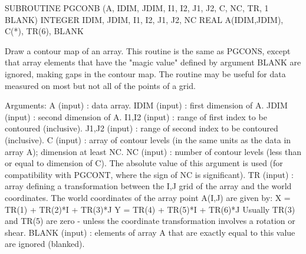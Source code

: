 {\eightpoint\begintt
      SUBROUTINE PGCONB (A, IDIM, JDIM, I1, I2, J1, J2, C, NC, TR, 
     1                   BLANK)
      INTEGER IDIM, JDIM, I1, I2, J1, J2, NC
      REAL    A(IDIM,JDIM), C(*), TR(6), BLANK
 
Draw a contour map of an array. This routine is the same as PGCONS,
except that array elements that have the "magic value" defined by
argument BLANK are ignored, making gaps in the contour map. The
routine may be useful for data measured on most but not all of the
points of a grid.
 
Arguments:
 A      (input)  : data array.
 IDIM   (input)  : first dimension of A.
 JDIM   (input)  : second dimension of A.
 I1,I2  (input)  : range of first index to be contoured (inclusive).
 J1,J2  (input)  : range of second index to be contoured (inclusive).
 C      (input)  : array of contour levels (in the same units as the
                   data in array A); dimension at least NC.
 NC     (input)  : number of contour levels (less than or equal to
                   dimension of C). The absolute value of this
                   argument is used (for compatibility with PGCONT,
                   where the sign of NC is significant).
 TR     (input)  : array defining a transformation between the I,J
                   grid of the array and the world coordinates. The
                   world coordinates of the array point A(I,J) are
                   given by:
                     X = TR(1) + TR(2)*I + TR(3)*J
                     Y = TR(4) + TR(5)*I + TR(6)*J
                   Usually TR(3) and TR(5) are zero - unless the
                   coordinate transformation involves a rotation
                   or shear.
 BLANK   (input) : elements of array A that are exactly equal to
                   this value are ignored (blanked).
\endtt}

